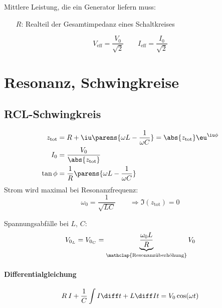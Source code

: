 		Mittlere Leistung, die ein Generator liefern muss:
		\begin{itemize}
			\item[$R$:] Realteil der Gesamtimpedanz eines Schaltkreises
		\end{itemize}
		\begin{equation*}
			V_{\text{eff}} = \frac{V_0}{\sqrt 2} \qquad
			I_{\text{eff}} = \frac{I_0}{\sqrt 2}
		\end{equation*}
\section{Resonanz, Schwingkreise} %
	\subsection{RCL-Schwingkreis} %
		\begin{align*}
			z_{\text{tot}} &= R + \iu \parens{
				\omega L - \frac{1}{\omega C}
			} = \abs{z_\text{tot}} \eu^{\iu \phi} \\
			I_0 &= \frac{V_0}{\abs{z_\text{tot}}} \\
			\tan \phi &= \frac{1}{R} \parens{
				\omega L - \frac{1}{\omega C}
			}
		\end{align*}
		Strom wird maximal bei Resonanzfrequenz:
		\begin{equation*}
			\omega_0 = \frac{1}{\sqrt{LC}} \qquad \Rightarrow \Im(z_\text{tot}) = 0
		\end{equation*}
		
		Spannungsabfälle bei $L$, $C$:
		\begin{equation*}
			V_{0_L} = V_{0_C} = \underbrace{\frac{\omega_0 L}{R}}_{\mathclap{\text{Resonanzüberhöhung}}} V_0
		\end{equation*}
		
		\paragraph{Differentialgleichung} %
			\begin{equation*}
				R\:I + \frac{1}{C} \int I \diff t + L \diff I t = V_0 \cos(\omega t)
			\end{equation*}
		
